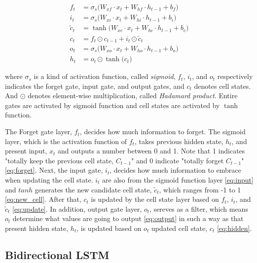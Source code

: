 \documentclass[letterpaper, 10 pt, conference]{ieeeconf}  %
\begin{document}
\begin{align}
f_{t} & =\sigma _{s}\big(W_{xf}\cdot x_{t}+W_{hf}\cdot h_{t-1}+b_{f}\big)\label{eq:forget}\\
i_{t} & =\sigma _{s}\big(W_{xi}\cdot x_{t}+W_{hi}\cdot h_{t-1}+b_{i}\big)\label{eq:input}\\
\tilde{c}_{t} & = \tanh\big(W_{xc}\cdot x_{t}+W_{hc}\cdot h_{t-1}+b_{c}\big)\label{eq:new_cell}\\
c_{t} & =f_{t}\odot c_{t-1}+i_{t}\odot\tilde{c}_{t}\label{eq:update}\\
o_{t} & =\sigma _{s}\big(W_{xo}\cdot x_{t}+W_{ho}\cdot h_{t-1}+b_{o}\big)\label{eq:output}\\
h_{t} & =o_{t}\odot \tanh\big(c_{t}\big)\label{eq:hidden}
\end{align}

where $\sigma _{s}$ is a kind of activation function, called \textit{sigmoid},  $f_{t}$, $i_{t}$, and $o_{t}$ respectively indicates the forget gate, input gate, and output gates, and $c_{t}$ denotes cell states. And $\odot$ denotes element-wise multiplication, called \textit{Hadamard product}. Entire gates are activated by sigmoid function and cell states are activated by $\tanh$ function.

The Forget gate layer, $f_{t}$, decides how much information to forget. The sigmoid layer, which is the activation function of $f_{t}$, takes previous hidden state, $h_{t}$, and present input, $x_{t}$ and outputs a number between 0 and 1. Note that 1 indicates "totally keep the previous cell state, $C_{t-1}$" and 0 indicate "totally forget $C_{t-1}$" \eqref{eq:forget}. Next, the input gate, $i_{t}$, decides how much information to embrace when updating the cell state. $i_{t}$ are also from the sigmoid function layer \eqref{eq:input} and $tanh$ generates the new candidate cell state, $\tilde{c}_{t}$, which ranges from -1 to 1 \eqref{eq:new_cell}. After that, $c_{t}$ is updated by the cell state layer based on $f_{t}$, $i_{t}$, and $\tilde{c}_{t}$ \eqref{eq:update}. In addition, output gate layer, $o_{t}$, sereves as a filter, which means $o_{t}$ determine what values are going to output \eqref{eq:output} in such a way as that present hidden state, $h_{t}$, is updated based on $o_{t}$ updated cell state, $c_{t}$ \eqref{eq:hidden}. 


\subsection{Bidirectional LSTM}
\end{document}
